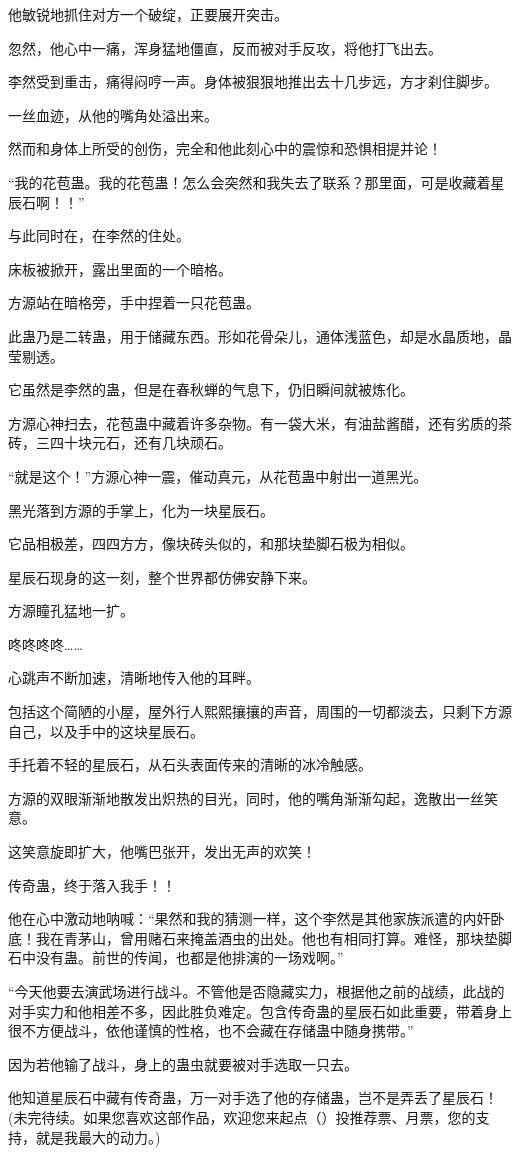 \begin{this_body}
他敏锐地抓住对方一个破绽，正要展开突击。

忽然，他心中一痛，浑身猛地僵直，反而被对手反攻，将他打飞出去。

李然受到重击，痛得闷哼一声。身体被狠狠地推出去十几步远，方才刹住脚步。

一丝血迹，从他的嘴角处溢出来。

然而和身体上所受的创伤，完全和他此刻心中的震惊和恐惧相提并论！

“我的花苞蛊。我的花苞蛊！怎么会突然和我失去了联系？那里面，可是收藏着星辰石啊！！”

与此同时在，在李然的住处。

床板被掀开，露出里面的一个暗格。

方源站在暗格旁，手中捏着一只花苞蛊。

此蛊乃是二转蛊，用于储藏东西。形如花骨朵儿，通体浅蓝色，却是水晶质地，晶莹剔透。

它虽然是李然的蛊，但是在春秋蝉的气息下，仍旧瞬间就被炼化。

方源心神扫去，花苞蛊中藏着许多杂物。有一袋大米，有油盐酱醋，还有劣质的茶砖，三四十块元石，还有几块顽石。

“就是这个！”方源心神一震，催动真元，从花苞蛊中射出一道黑光。

黑光落到方源的手掌上，化为一块星辰石。

它品相极差，四四方方，像块砖头似的，和那块垫脚石极为相似。

星辰石现身的这一刻，整个世界都仿佛安静下来。

方源瞳孔猛地一扩。

咚咚咚咚……

心跳声不断加速，清晰地传入他的耳畔。

包括这个简陋的小屋，屋外行人熙熙攘攘的声音，周围的一切都淡去，只剩下方源自己，以及手中的这块星辰石。

手托着不轻的星辰石，从石头表面传来的清晰的冰冷触感。

方源的双眼渐渐地散发出炽热的目光，同时，他的嘴角渐渐勾起，逸散出一丝笑意。

这笑意旋即扩大，他嘴巴张开，发出无声的欢笑！

传奇蛊，终于落入我手！！

他在心中激动地呐喊：“果然和我的猜测一样，这个李然是其他家族派遣的内奸卧底！我在青茅山，曾用赌石来掩盖酒虫的出处。他也有相同打算。难怪，那块垫脚石中没有蛊。前世的传闻，也都是他排演的一场戏啊。”

“今天他要去演武场进行战斗。不管他是否隐藏实力，根据他之前的战绩，此战的对手实力和他相差不多，因此胜负难定。包含传奇蛊的星辰石如此重要，带着身上很不方便战斗，依他谨慎的性格，也不会藏在存储蛊中随身携带。”

因为若他输了战斗，身上的蛊虫就要被对手选取一只去。

他知道星辰石中藏有传奇蛊，万一对手选了他的存储蛊，岂不是弄丢了星辰石！(未完待续。如果您喜欢这部作品，欢迎您来起点（）投推荐票、月票，您的支持，就是我最大的动力。)

\end{this_body}

